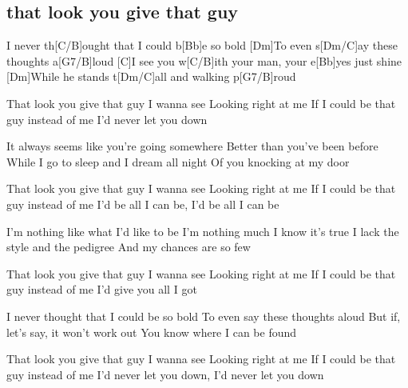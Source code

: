 \subsection*{that look you give that guy   }
\begin{guitar}
[C]I never th[C/B]ought that I could b[Bb]e so bold\qquad[A]{}
[Dm]To even s[Dm/C]ay these thoughts a[G7/B]loud\qquad[G7]{}
[C]I see you w[C/B]ith your man, your e[Bb]yes just shine\qquad[A]{}
[Dm]While he stands t[Dm/C]all and walking p[G7/B]roud\qquad[G7]{}



That look you give that guy I wanna see
Looking right at me
If I could be that guy instead of me
I'd never let you down



It always seems like you're going somewhere
Better than you've been before
While I go to sleep and I dream all night
Of you knocking at my door



That look you give that guy I wanna see
Looking right at me
If I could be that guy instead of me
I'd be all I can be, I'd be all I can be



I'm nothing like what I'd like to be
I'm nothing much I know it's true
I lack the style and the pedigree
And my chances are so few



That look you give that guy I wanna see
Looking right at me
If I could be that guy instead of me
I'd give you all I got



I never thought that I could be so bold
To even say these thoughts aloud
But if, let's say, it won't work out
You know where I can be found



That look you give that guy I wanna see
Looking right at me
If I could be that guy instead of me
I'd never let you down, I'd never let you down
\end{guitar}
